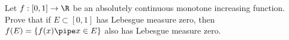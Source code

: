 Let $f:[0,1]\rightarrow \R$ be an absolutely continuous monotone
increasing function. Prove that if $E\subset [0,1]$ has Lebesgue
measure zero, then $f(E)=\{f(x)\pipe x\in E\}$ also has Lebesgue
measure zero.
